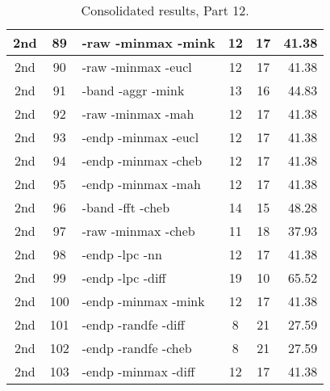 \begin{table}
\begin{minipage}[b]{\textwidth}
\begin{tabular}{|c|c|l|c|c|r|}
2nd & 89 & -raw -minmax -mink  & 12 & 17 & 41.38\\ \hline
2nd & 90 & -raw -minmax -eucl  & 12 & 17 & 41.38\\ \hline
2nd & 91 & -band -aggr -mink  & 13 & 16 & 44.83\\ \hline
2nd & 92 & -raw -minmax -mah  & 12 & 17 & 41.38\\ \hline
2nd & 93 & -endp -minmax -eucl  & 12 & 17 & 41.38\\ \hline
2nd & 94 & -endp -minmax -cheb  & 12 & 17 & 41.38\\ \hline
2nd & 95 & -endp -minmax -mah  & 12 & 17 & 41.38\\ \hline
2nd & 96 & -band -fft -cheb  & 14 & 15 & 48.28\\ \hline
2nd & 97 & -raw -minmax -cheb  & 11 & 18 & 37.93\\ \hline
2nd & 98 & -endp -lpc -nn  & 12 & 17 & 41.38\\ \hline
2nd & 99 & -endp -lpc -diff  & 19 & 10 & 65.52\\ \hline
2nd & 100 & -endp -minmax -mink  & 12 & 17 & 41.38\\ \hline
2nd & 101 & -endp -randfe -diff  & 8 & 21 & 27.59\\ \hline
2nd & 102 & -endp -randfe -cheb  & 8 & 21 & 27.59\\ \hline
2nd & 103 & -endp -minmax -diff  & 12 & 17 & 41.38\\ \hline
\end{tabular}
\end{minipage}
\caption{Consolidated results, Part 12.}
\label{tab:results12}
\end{table}


